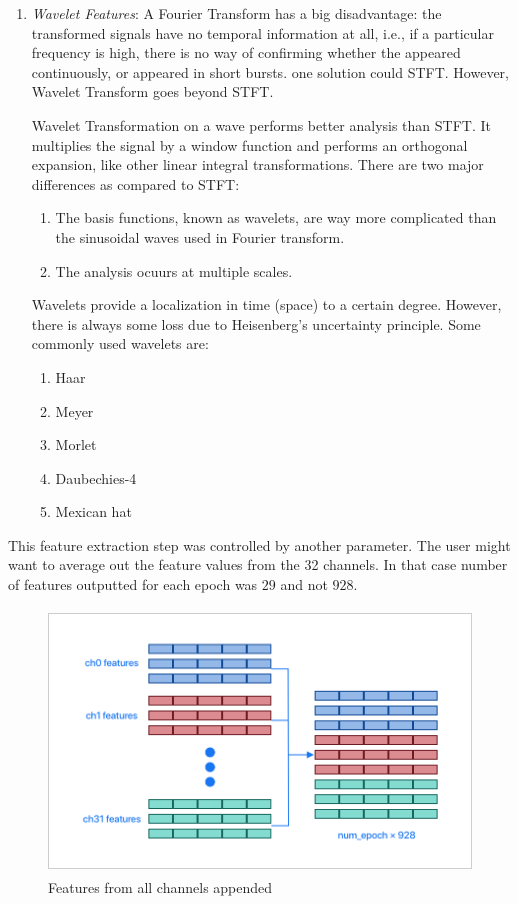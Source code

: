 \begin{enumerate}
\item \emph{Wavelet Features}: A Fourier Transform has a big disadvantage: the transformed signals have no temporal information at all, i.e., if a particular frequency is high, there is no way of confirming whether the appeared continuously, or appeared in short bursts. one solution could STFT. However, Wavelet Transform goes beyond STFT.

Wavelet Transformation on a wave performs better analysis than STFT. It multiplies the signal by a window function and performs an orthogonal expansion, like other linear integral transformations. There are two major differences as compared to STFT:
\begin{enumerate}
    \item The basis functions, known as wavelets, are way more complicated than the sinusoidal waves used in Fourier transform.
    \item The analysis ocuurs at multiple scales.
\end{enumerate}
Wavelets provide a localization in time (space) to a certain degree. However, there is always some loss due to Heisenberg's uncertainty principle. Some commonly used wavelets are:
\begin{enumerate}
    \item Haar
    \item Meyer
    \item Morlet
    \item Daubechies-4
    \item Mexican hat
\end{enumerate}
\end{enumerate}
This feature extraction step was controlled by another parameter. The user might want to average out the feature values from the 32 channels. In that case number of features outputted for each epoch was $29$ and not $928$.

\begin{figure}[H]
\centering
\includegraphics[height=7cm]{Figures/feat_channel_concat.png}
\caption{Features from all channels appended}
\label{fig23}
\end{figure}

